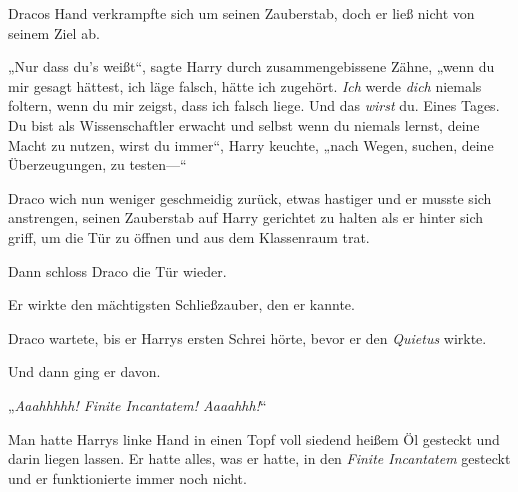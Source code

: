 Dracos Hand verkrampfte sich um seinen Zauberstab, doch er ließ nicht von seinem Ziel ab.

„Nur dass du’s weißt“, sagte Harry durch zusammengebissene Zähne, „wenn du mir gesagt hättest, ich läge falsch, hätte ich zugehört. \emph{Ich} werde \emph{dich} niemals foltern, wenn du mir zeigst, dass ich falsch liege. Und das \emph{wirst} du. Eines Tages. Du bist als Wissenschaftler erwacht und selbst wenn du niemals lernst, deine Macht zu nutzen, wirst du immer“, Harry keuchte, „nach Wegen, suchen, deine Überzeugungen, zu testen—“

Draco wich nun weniger geschmeidig zurück, etwas hastiger und er musste sich anstrengen, seinen Zauberstab auf Harry gerichtet zu halten als er hinter sich griff, um die Tür zu öffnen und aus dem Klassenraum trat.

Dann schloss Draco die Tür wieder.

Er wirkte den mächtigsten Schließzauber, den er kannte.

Draco wartete, bis er Harrys ersten Schrei hörte, bevor er den \emph{Quietus} wirkte.

Und dann ging er davon.

\later

„\emph{Aaahhhhh! Finite Incantatem! Aaaahhh!}“

Man hatte Harrys linke Hand in einen Topf voll siedend heißem Öl gesteckt und darin liegen lassen. Er hatte alles, was er hatte, in den \emph{Finite Incantatem} gesteckt und er funktionierte immer noch nicht.

